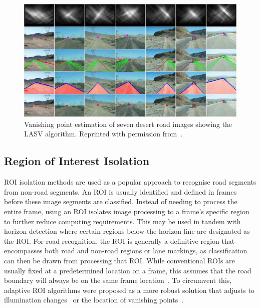 \begin{figure}[H]
	\centering
	\includegraphics[width=\linewidth]{kongvanishingpoint.jpg}
	\caption[Vanishing point estimation]{\label{fig:vanishingpoint}Vanishing point estimation of seven desert road images showing the LASV algorithm. Reprinted with permission from~\cite{h._kong_general_2010}.}
\end{figure}

\subsection{Region of Interest Isolation} \label{secregion}
ROI isolation methods are used as a popular approach to recognise road segments from non-road segments. An ROI is usually identified and defined in frames before these image segments are classified. Instead of needing to process the entire frame, using an ROI isolates image processing to a frame's specific region to further reduce computing requirements. This may be used in tandem with horizon detection where certain regions below the horizon line are designated as the ROI. For road recognition, the ROI is generally a definitive region that encompasses both road and non-road regions or lane markings, as classification can then be drawn from processing that ROI. While conventional ROIs are usually fixed at a predetermined location on a frame, this assumes that the road boundary will always be on the same frame location~\cite{k._ghazali_road_2012,t._y._chen_vehicle_2015}. To circumvent this, adaptive ROI algorithms were proposed as a more robust solution that adjusts to illumination changes~\cite{bottazzi_adaptive_2014} or the location of vanishing points~\cite{d._ding_adaptive_2013}. 

